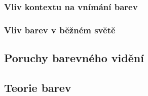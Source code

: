 \subsubsection{Vliv kontextu na vnímání barev}

\subsubsection{Vliv barev v běžném světě}

\subsection{Poruchy barevného vidění}

\subsection{Teorie barev}

